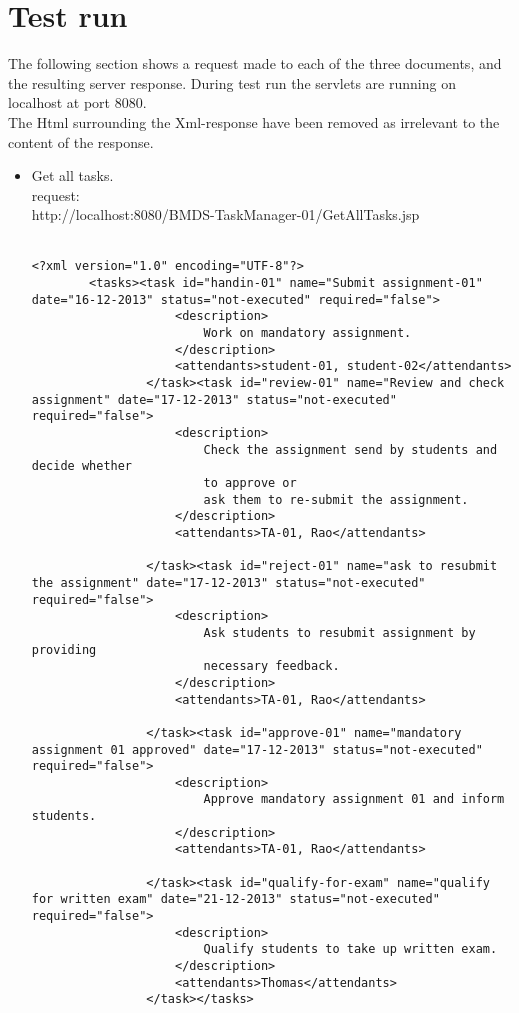 	\section{Test run}
	\label{servlet_test}
	The following section shows a request made to each of the three documents, and the resulting server response. During test run the servlets are running on localhost at port 8080.\\
	The Html surrounding the Xml-response have been removed as irrelevant to the content of the response.\\
	\begin{itemize}
		\item
		Get all tasks.\\
		request:\\
		http://localhost:8080/BMDS-TaskManager-01/GetAllTasks.jsp\\\\
		
		\begin{lstlisting}[caption=response:]
		<?xml version="1.0" encoding="UTF-8"?>
		<tasks><task id="handin-01" name="Submit assignment-01" date="16-12-2013" status="not-executed" required="false">
					<description>
						Work on mandatory assignment.
					</description>
					<attendants>student-01, student-02</attendants>
				</task><task id="review-01" name="Review and check assignment" date="17-12-2013" status="not-executed" required="false">
					<description>
						Check the assignment send by students and decide whether
						to approve or
						ask them to re-submit the assignment.
					</description>
					<attendants>TA-01, Rao</attendants>
		
				</task><task id="reject-01" name="ask to resubmit the assignment" date="17-12-2013" status="not-executed" required="false">
					<description>
						Ask students to resubmit assignment by providing
						necessary feedback.
					</description>
					<attendants>TA-01, Rao</attendants>
		
				</task><task id="approve-01" name="mandatory assignment 01 approved" date="17-12-2013" status="not-executed" required="false">
					<description>
						Approve mandatory assignment 01 and inform students.
					</description>
					<attendants>TA-01, Rao</attendants>
		
				</task><task id="qualify-for-exam" name="qualify for written exam" date="21-12-2013" status="not-executed" required="false">
					<description>
						Qualify students to take up written exam.
					</description>
					<attendants>Thomas</attendants>
				</task></tasks>
		\end{lstlisting}
						

\end{itemize}
